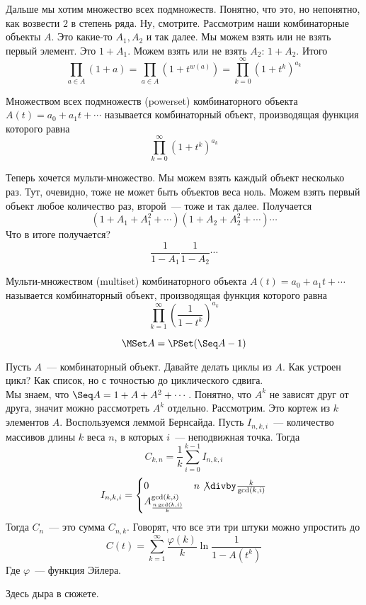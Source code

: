 \documentclass{article}
\begin{document}
    \begin{remark}
        Дальше мы хотим множество всех подмножеств. Понятно, что это, но непонятно, как возвести $2$ в степень ряда. Ну, смотрите. Рассмотрим наши комбинаторные объекты $A$. Это какие-то $A_1,A_2$ и так далее. Мы можем взять или не взять первый элемент. Это $1+A_1$. Можем взять или не взять $A_2$: $1+A_2$. Итого
        $$
        \prod\limits_{a\in A}(1+a)=\prod\limits_{a\in A}(1+t^{w(a)})=\prod\limits_{k=0}^\infty(1+t^k)^{a_k}
        $$
    \end{remark}
    \begin{definition}
        Множеством всех подмножеств (powerset) комбинаторного объекта $A(t)=a_0+a_1t+\cdots$ называется комбинаторный объект, производящая функция которого равна
        $$
        \prod\limits_{k=0}^\infty(1+t^k)^{a_k}
        $$
    \end{definition}
    \begin{remark}
        Теперь хочется мульти-множество. Мы можем взять каждый объект несколько раз. Тут, очевидно, тоже не может быть объектов веса ноль. Можем взять первый объект любое количество раз, второй~--- тоже и так далее. Получается
        $$
        \left(1+A_1+A_1^2+\cdots\right)\left(1+A_2+A_2^2+\cdots\right)\cdots
        $$
        Что в итоге получается?
        $$
        \frac1{1-A_1}\frac1{1-A_2}\cdots
        $$
    \end{remark}
    \begin{definition}
        Мульти-множеством (multiset) комбинаторного объекта $A(t)=a_0+a_1t+\cdots$ называется комбинаторный объект, производящая функция которого равна
        $$
        \prod\limits_{k=1}^\infty\left(\frac1{1-t^k}\right)^{a_k}
        $$
    \end{definition}
    \begin{claim}
        $$
        \MSet A=\PSet(\Seq A-1)
        $$
    \end{claim}
    \begin{remark}
        Пусть $A$~--- комбинаторный объект. Давайте делать циклы из $A$. Как устроен цикл? Как список, но с точностью до циклического сдвига.\\
        Мы знаем, что $\Seq A=1+A+A^2+\cdots$. Понятно, что $A^k$ не зависят друг от друга, значит можно рассмотреть $A^k$ отдельно. Рассмотрим. Это кортеж из $k$ элементов $A$. Воспользуемся леммой Бернсайда. Пусть $I_{n,k,i}$~--- количество массивов длины $k$ веса $n$, в которых $i$~--- неподвижная точка. Тогда
        $$
        C_{k,n}=\frac1k\sum\limits_{i=0}^{k-1}I_{n,k,i}
        $$
        $$
        I_{n,k,i}=\begin{cases}
            0 & n\not\divby\frac k{\gcd(k,i)}\\
            A^{\gcd(k,i)}_{\frac{n\gcd(k,i)}k} &
        \end{cases}
        $$
        Тогда $C_n$~--- это сумма $C_{n,k}$. Говорят, что все эти три штуки можно упростить до
        $$
        C(t)=\sum\limits_{k=1}^\infty\frac{\varphi(k)}k\ln\frac1{1-A(t^k)}
        $$
        Где $\varphi$~--- функция Эйлера.
    \end{remark}
    \begin{remark}
        Здесь дыра в сюжете.
    \end{remark}
\end{document}
